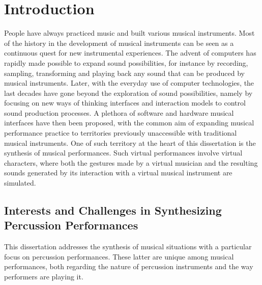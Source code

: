 \chapter{Introduction}
\label{chapter:Introduction}



People have always practiced music and built various musical instruments. Most of the history in the development of musical instruments can be seen as a continuous quest for new instrumental experiences. The advent of computers has rapidly made possible to expand sound possibilities, for instance by recording, sampling, transforming and playing back any sound that can be produced by musical instruments. Later, with the everyday use of computer technologies, the last decades have gone beyond the exploration of sound possibilities, namely by focusing on new ways of thinking interfaces and interaction models to control sound production processes. A plethora of software and hardware musical interfaces have then been proposed, with the common aim of expanding musical performance practice to territories previously unaccessible with traditional musical instruments. One of such territory at the heart of this dissertation is the synthesis of musical performances. Such virtual performances involve virtual characters, where both the gestures made by a virtual musician and the resulting sounds generated by its interaction with a virtual musical instrument are simulated. %




	\section{Interests and Challenges in Synthesizing Percussion Performances}

This dissertation addresses the synthesis of musical situations with a particular focus on percussion performances. These latter are unique among musical performances, both regarding the nature of percussion instruments and the way performers are playing it.\\

